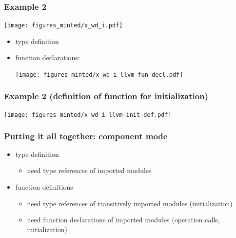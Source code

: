 \documentclass[12pt]{beamer}
\begin{document}
\begin{frame}

  \frametitle{Example 2}

  \begin{center}
    \texttt{[image: figures\_minted/x\_wd\_i.pdf]}
  \end{center}

  \begin{itemize}
    \item type definition

{\small \textcolor{blue}{}}
    \item function declarations:

    \texttt{[image: figures\_minted/x\_wd\_i\_llvm-fun-decl.pdf]}

    \end{itemize}
\end{frame}

\begin{frame}

  \frametitle{Example 2 (definition of function for initialization)}

  \texttt{[image: figures\_minted/x\_wd\_i\_llvm-init-def.pdf]}

\end{frame}

\begin{frame}

  \frametitle{Putting it all together: component mode}

  \begin{itemize}
  \item type definition
    \begin{itemize}
    \item need type references of imported modules
    \end{itemize}
  \item function definitions
    \begin{itemize}
    \item need type references of transitively imported
      modules (initialization)
    \item need function declarations of imported modules
      (operation calls, initialization)
    \end{itemize}
  \end{itemize}

\end{frame}
\end{document}
